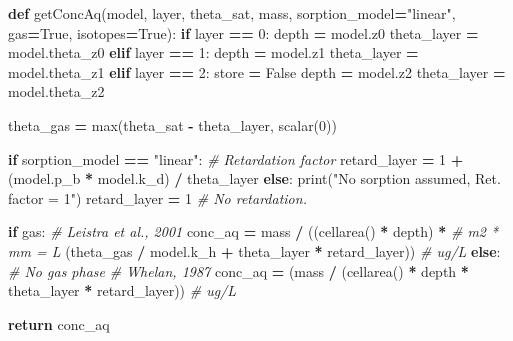 \documentclass[]{article}
\newenvironment{Shaded}{\begin{snugshade}}{\end{snugshade}}
\newcommand{\KeywordTok}[1]{\textcolor[rgb]{0.13,0.29,0.53}{\textbf{{#1}}}}
\newcommand{\DecValTok}[1]{\textcolor[rgb]{0.00,0.00,0.81}{{#1}}}
\newcommand{\StringTok}[1]{\textcolor[rgb]{0.31,0.60,0.02}{{#1}}}
\newcommand{\CommentTok}[1]{\textcolor[rgb]{0.56,0.35,0.01}{\textit{{#1}}}}
\newcommand{\VariableTok}[1]{\textcolor[rgb]{0.00,0.00,0.00}{{#1}}}
\newcommand{\ControlFlowTok}[1]{\textcolor[rgb]{0.13,0.29,0.53}{\textbf{{#1}}}}
\newcommand{\OperatorTok}[1]{\textcolor[rgb]{0.81,0.36,0.00}{\textbf{{#1}}}}
\newcommand{\BuiltInTok}[1]{{#1}}
\newcommand{\NormalTok}[1]{{#1}}
\begin{document}
\begin{Shaded}
\begin{Highlighting}[]

\KeywordTok{def} \NormalTok{getConcAq(model, layer, theta_sat, mass,}
              \NormalTok{sorption_model}\OperatorTok{=}\StringTok{"linear"}\NormalTok{, gas}\OperatorTok{=}\VariableTok{True}\NormalTok{, isotopes}\OperatorTok{=}\VariableTok{True}\NormalTok{):}
    \ControlFlowTok{if} \NormalTok{layer }\OperatorTok{==} \DecValTok{0}\NormalTok{:}
        \NormalTok{depth }\OperatorTok{=} \NormalTok{model.z0}
        \NormalTok{theta_layer }\OperatorTok{=} \NormalTok{model.theta_z0}
    \ControlFlowTok{elif} \NormalTok{layer }\OperatorTok{==} \DecValTok{1}\NormalTok{:}
        \NormalTok{depth }\OperatorTok{=} \NormalTok{model.z1}
        \NormalTok{theta_layer }\OperatorTok{=} \NormalTok{model.theta_z1}
    \ControlFlowTok{elif} \NormalTok{layer }\OperatorTok{==} \DecValTok{2}\NormalTok{:}
        \NormalTok{store }\OperatorTok{=} \VariableTok{False}
        \NormalTok{depth }\OperatorTok{=} \NormalTok{model.z2}
        \NormalTok{theta_layer }\OperatorTok{=} \NormalTok{model.theta_z2}

    \NormalTok{theta_gas }\OperatorTok{=} \BuiltInTok{max}\NormalTok{(theta_sat }\OperatorTok{-} \NormalTok{theta_layer, scalar(}\DecValTok{0}\NormalTok{))}

    \ControlFlowTok{if} \NormalTok{sorption_model }\OperatorTok{==} \StringTok{"linear"}\NormalTok{:}
        \CommentTok{# Retardation factor}
        \NormalTok{retard_layer }\OperatorTok{=} \DecValTok{1} \OperatorTok{+} \NormalTok{(model.p_b }\OperatorTok{*} \NormalTok{model.k_d) }\OperatorTok{/} \NormalTok{theta_layer}
    \ControlFlowTok{else}\NormalTok{:}
        \BuiltInTok{print}\NormalTok{(}\StringTok{"No sorption assumed, Ret. factor = 1"}\NormalTok{)}
        \NormalTok{retard_layer }\OperatorTok{=} \DecValTok{1}  \CommentTok{# No retardation.}

    \ControlFlowTok{if} \NormalTok{gas:}
        \CommentTok{# Leistra et al., 2001}
        \NormalTok{conc_aq }\OperatorTok{=} \NormalTok{mass }\OperatorTok{/} \NormalTok{((cellarea() }\OperatorTok{*} \NormalTok{depth) }\OperatorTok{*}  \CommentTok{# m2 * mm = L}
                          \NormalTok{(theta_gas }\OperatorTok{/} \NormalTok{model.k_h }\OperatorTok{+}
                           \NormalTok{theta_layer }\OperatorTok{*} \NormalTok{retard_layer))  }\CommentTok{# ug/L}
    \ControlFlowTok{else}\NormalTok{:  }\CommentTok{# No gas phase}
        \CommentTok{# Whelan, 1987}
        \NormalTok{conc_aq }\OperatorTok{=} \NormalTok{(mass }\OperatorTok{/} \NormalTok{(cellarea() }\OperatorTok{*} \NormalTok{depth }\OperatorTok{*} \NormalTok{theta_layer }\OperatorTok{*} \NormalTok{retard_layer))  }\CommentTok{# ug/L}

    \ControlFlowTok{return} \NormalTok{conc_aq}
\end{Highlighting}
\end{Shaded}
\end{document}
